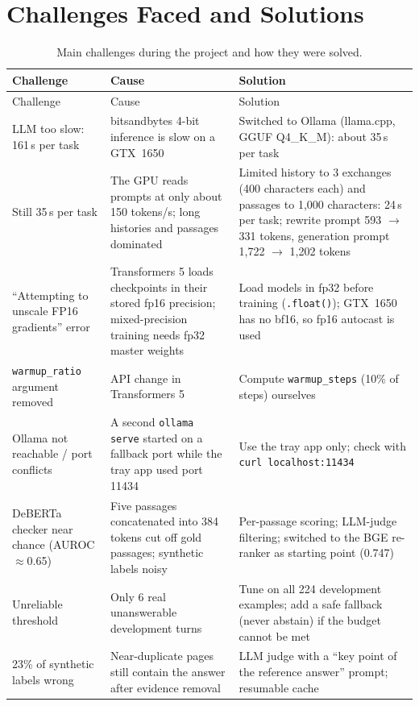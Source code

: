 \documentclass[11pt,a4paper]{report}
\begin{document}
\chapter{Challenges Faced and Solutions}\label{ch:challenges}
\begin{longtable}{@{}p{4.3cm}p{5.2cm}p{5.3cm}@{}}
\caption{Main challenges during the project and how they were solved.}\\
\toprule
Challenge & Cause & Solution \\
\midrule
\endfirsthead
\toprule
Challenge & Cause & Solution \\
\midrule
\endhead
LLM too slow: 161\,s per task & bitsandbytes 4-bit inference is slow on a GTX~1650 & Switched to Ollama (llama.cpp, GGUF Q4\_K\_M): about 35\,s per task \\
Still 35\,s per task & The GPU reads prompts at only about 150 tokens/s; long histories and passages dominated & Limited history to 3 exchanges (400 characters each) and passages to 1{,}000 characters: 24\,s per task; rewrite prompt 593 $\to$ 331 tokens, generation prompt 1{,}722 $\to$ 1{,}202 tokens \\
``Attempting to unscale FP16 gradients'' error & Transformers 5 loads checkpoints in their stored fp16 precision; mixed-precision training needs fp32 master weights & Load models in fp32 before training (\texttt{.float()}); GTX~1650 has no bf16, so fp16 autocast is used \\
\texttt{warmup\_ratio} argument removed & API change in Transformers 5 & Compute \texttt{warmup\_steps} (10\% of steps) ourselves \\
Ollama not reachable / port conflicts & A second \texttt{ollama serve} started on a fallback port while the tray app used port 11434 & Use the tray app only; check with \texttt{curl localhost:11434} \\
DeBERTa checker near chance (AUROC $\approx$0.65) & Five passages concatenated into 384 tokens cut off gold passages; synthetic labels noisy & Per-passage scoring; LLM-judge filtering; switched to the BGE re-ranker as starting point (0.747) \\
Unreliable threshold & Only 6 real unanswerable development turns & Tune on all 224 development examples; add a safe fallback (never abstain) if the budget cannot be met \\
23\% of synthetic labels wrong & Near-duplicate pages still contain the answer after evidence removal & LLM judge with a ``key point of the reference answer'' prompt; resumable cache \\

\end{longtable}
\end{document}
